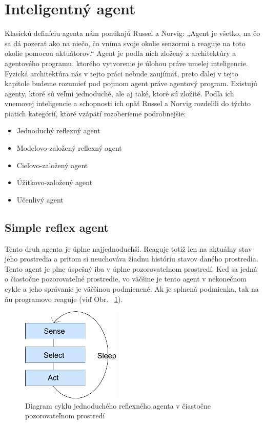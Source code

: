 \documentclass[12pt,a4paper]{report}
\begin{document}
\section{Inteligentný agent}
	Klasickú definíciu agenta nám ponúkajú Russel a Norvig:
„Agent je všetko, na čo sa dá pozerať ako na niečo, čo vníma svoje okolie senzormi a reaguje na toto okolie pomocou aktuátorov.“ 
Agent je podľa nich zložený z architektúry a agentového programu, ktorého vytvorenie je úlohou práve umelej inteligencie. Fyzická architektúra nás v tejto práci nebude zaujímať, preto ďalej v tejto kapitole budeme rozumieť pod pojmom agent práve agentový program. Existujú agenty, ktoré sú veľmi jednoduché, ale aj také, ktoré sú zložité. Podľa ich vnemovej inteligencie a schopnosti ich opäť Russel a Norvig rozdelili do týchto piatich kategórií, ktoré vzápätí rozoberieme podrobnejšie:
\begin{itemize}
	\item
	Jednoduchý reflexný agent
	\item
	Modelovo-založený reflexný agent
	\item
	Cieľovo-založený agent
	\item
	Úžitkovo-založený agent
	\item
	Učenlivý agent
\end{itemize}
\subsection{Simple reflex agent} 
	Tento druh agenta je úplne najjednoduchší. Reaguje totiž len na aktuálny stav jeho prostredia a pritom si neuchováva žiadnu históriu stavov daného prostredia. Tento agent je plne úspešný iba v úplne pozorovateľnom prostredí. Keď sa jedná o čiastočne pozorovateľné prostredie, vo väčšine je tento agent v nekonečnom cykle a jeho správanie je väčšinou podmienené. Ak je splnená podmienka, tak na ňu programovo reaguje (viď Obr. ~\ref{fig:lifecycle}). 

\begin{figure}[h!]
\centering
  \includegraphics{lifecycle}
  \caption{Diagram cyklu jednoduchého reflexného agenta v čiastočne pozorovateľnom prostredí}
  \label{fig:lifecycle}
\end{figure}
\end{document}
